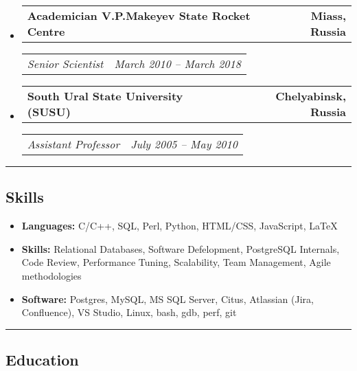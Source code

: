 \documentclass[11pt,letterpaper]{article}
\makeatletter
\newcommand{\headerrow}[2]
{\begin{tabular*}{\linewidth}{l@{\extracolsep{\fill}}r}
#1 &
#2 \\
\end{tabular*}}
\makeatother
\begin{document}
\begin{itemize}[leftmargin=1em]
\begin{itemize*}
	      \end{itemize*}
	\item
	      \headerrow
	      {\textbf{Academician V.P.Makeyev State Rocket Centre}}
	      {\textbf{Miass, Russia}}
	      \headerrow
	      {\emph{Senior Scientist}}
	      {\emph{March 2010 -- March 2018}}
	\item
	      \headerrow
	      {\textbf{South Ural State University (SUSU)}}
	      {\textbf{Chelyabinsk, Russia}}
	      \headerrow
	      {\emph{Assistant Professor}}
	      {\emph{July 2005 -- May 2010}}
\end{itemize}

\hrule
\vspace{-1em}
\subsection*{\Large Skills}

\begin{itemize}[leftmargin=1em,noitemsep]
	\item \textbf{Languages:}
		C/C++, SQL, Perl, Python, HTML/CSS, JavaScript, \LaTeX
	\item \textbf{Skills:}
		Relational Databases, Software Defelopment, PostgreSQL Internals, Code Review, Performance Tuning, Scalability, Team Management, Agile methodologies
	\item \textbf{Software:}
		Postgres, MySQL, MS SQL Server, Citus, Atlassian (Jira, Confluence), VS Studio, Linux, bash, gdb, perf, git
\end{itemize}

\hrule
\vspace{-1em}
\subsection*{\Large Education}
\end{document}
